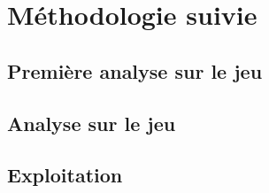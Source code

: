 \section{Méthodologie suivie}

\subsection{Première analyse sur le jeu \jeuc}

\subsection{Analyse sur le jeu \jeua}

\subsection{Exploitation}

